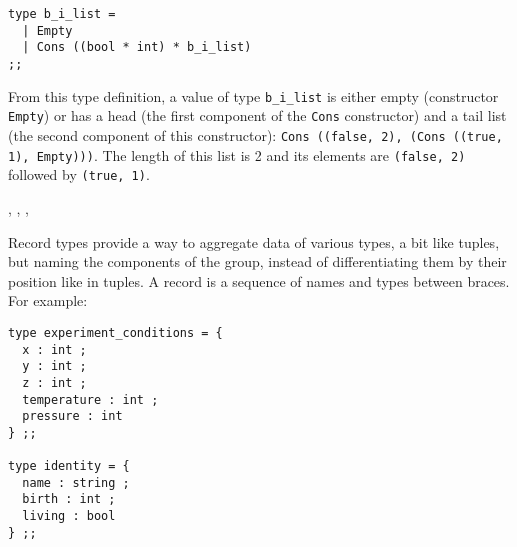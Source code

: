 {\scriptsize
\begin{lstlisting}
type b_i_list =
  | Empty
  | Cons ((bool * int) * b_i_list)
;;
\end{lstlisting}}

From this type definition, a value of type {\tt b\_i\_list} is
either empty (constructor {\tt Empty}) or has a head (the first
component of the {\tt Cons} constructor) and a tail list (the
second component of this constructor): {\tt Cons ((false, 2), (Cons
  ((true, 1), Empty)))}. The length of this list is 2 and its
elements are {\tt (false, 2)} followed by {\tt (true, 1)}.

\bigskip



\vspace{0.2cm}
\begin{syn}
 \is
  \tok{(}  \tok{)}
\sep
{} \is
  \tok{(}  \tok{)}
\sep
{} \is
  \tok{\vertical}  
\sep
{} \is
     \tok{=}
\end{syn}
\vspace{0.2cm}


\vspace{0.5cm}
\label{record-type-definition}

\bigskip

Record types provide a way to aggregate data of various types, a bit like
tuples, but naming the components of the group, instead of
differentiating them by their position like in tuples. A record is
a sequence of names and types between braces. For example:

{\scriptsize
\begin{lstlisting}
type experiment_conditions = {
  x : int ;
  y : int ;
  z : int ;
  temperature : int ;
  pressure : int
} ;;

type identity = {
  name : string ;
  birth : int ;
  living : bool
} ;;
\end{lstlisting}}

